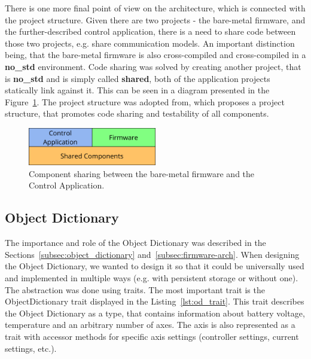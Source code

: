 There is one more final point of view on the architecture, which is connected with the project structure.
Given there are two projects - the bare-metal firmware, and the further-described control application, there is a need to share code between those two projects, e.g. share communication models.
An important distinction being, that the bare-metal firmware is also cross-compiled and cross-compiled in a \textbf{no\_std} environment.
Code sharing was solved by creating another project, that is \textbf{no\_std} and is simply called \textbf{shared}, both of the application projects statically link against it.
This can be seen in a diagram presented in the Figure~\ref{fig:component_arch}.
The project structure was adopted from\cite{aparicio_testing_nodate}, which proposes a project structure, that promotes code sharing and testability of all components.

\begin{figure}[H]
    \centering
    \includegraphics[width=0.5\textwidth]{obrazky/components}
    \caption{Component sharing between the bare-metal firmware and the Control Application.}
    \label{fig:component_arch}
\end{figure}

\subsection{Object Dictionary}
\label{subsec:object_dict_impl}
The importance and role of the Object Dictionary was described in the Sections~\ref{subsec:object_dictionary} and~\ref{subsec:firmware-arch}.
When designing the Object Dictionary, we wanted to design it so that it could be universally used and implemented in multiple ways (e.g. with persistent storage or without one).
The abstraction was done using traits.
The most important trait is the ObjectDictionary trait displayed in the Listing~\ref{lst:od_trait}.
This trait describes the Object Dictionary as a type, that contains information about battery voltage, temperature and an arbitrary number of axes.
The axis is also represented as a trait with accessor methods for specific axis settings (controller settings, current settings, etc.).

